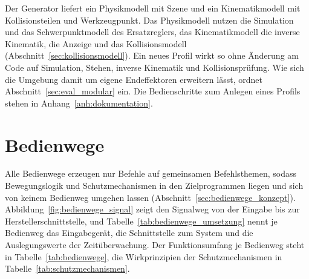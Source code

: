 Der Generator liefert ein Physikmodell mit Szene und ein Kinematikmodell mit Kollisionsteilen und Werkzeugpunkt.
Das Physikmodell nutzen die Simulation und das Schwerpunktmodell des Ersatzreglers, das Kinematikmodell die inverse Kinematik, die Anzeige und das Kollisionsmodell (Abschnitt~\ref{sec:kollisionsmodell}).
Ein neues Profil wirkt so ohne Änderung am Code auf Simulation, Stehen, inverse Kinematik und Kollisionsprüfung.
Wie sich die Umgebung damit um eigene Endeffektoren erweitern lässt, ordnet Abschnitt~\ref{sec:eval_modular} ein.
Die Bedienschritte zum Anlegen eines Profils stehen in Anhang~\ref{anh:dokumentation}.

\section{Bedienwege}
\label{sec:bedienwege}
Alle Bedienwege erzeugen nur Befehle auf gemeinsamen Befehlsthemen, sodass Bewegungslogik und Schutzmechanismen in den Zielprogrammen liegen und sich von keinem Bedienweg umgehen lassen (Abschnitt~\ref{sec:bedienwege_konzept}).
Abbildung~\ref{fig:bedienwege_signal} zeigt den Signalweg von der Eingabe bis zur Herstellerschnittstelle, und Tabelle~\ref{tab:bedienwege_umsetzung} nennt je Bedienweg das Eingabegerät, die Schnittstelle zum System und die Auslegungswerte der Zeitüberwachung.
Der Funktionsumfang je Bedienweg steht in Tabelle~\ref{tab:bedienwege}, die Wirkprinzipien der Schutzmechanismen in Tabelle~\ref{tab:schutzmechanismen}.

